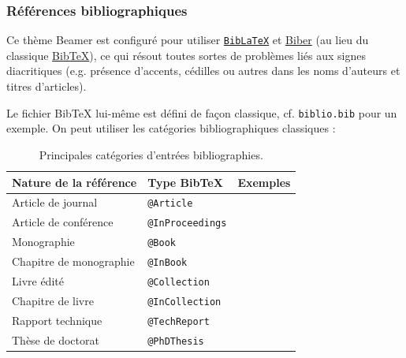\documentclass[10pt,    %
    french,             %
    xcolor=table,       %
    envcountsect,       %
    aspectratio=43      %
]{beamer}
\begin{document}
\begin{frame}
    \frametitle{Références bibliographiques}
    
    Ce thème Beamer est configuré pour utiliser \href{https://ctan.org/pkg/biblatex?lang=en}{\texttt{BibLaTeX}} et \href{http://biblatex-biber.sourceforge.net/}{Biber} (au lieu du classique \href{http://www.bibtex.org/}{BibTeX}), ce qui résout toutes sortes de problèmes liés aux signes diacritiques (e.g. présence d'accents, cédilles ou autres dans les noms d'auteurs et titres d'articles).
    
    \medskip
    Le fichier BibTeX lui-même est défini de façon classique, cf. \texttt{biblio.bib} pour un exemple. On peut utiliser les catégories bibliographiques classiques :
    
    \begin{table}[H]
        \small
        \centering
        \begin{tabular}{l l r}
            \hline
	        \rowcolor{fgLightRed} 
            \textbf{Nature de la référence} & \textbf{Type BibTeX} & \textbf{Exemples}\\
            \hline
            Article de journal & \texttt{@Article} & \cite{Fortunato2010, Cossu2016} \\
            Article de conférence & \texttt{@InProceedings} & \cite{Wei1989, Mauttone2008} \\
            Monographie & \texttt{@Book} & \cite{Wolsey1998, Masuda2016} \\
            Chapitre de monographie & \texttt{@InBook} & \cite{Mainzer2007a, Reichardt2009a} \\
            Livre édité & \texttt{@Collection} & \cite{Pastor-Satorras2003a, Brandes2005} \\
            Chapitre de livre & \texttt{@InCollection} & \cite{Danon2007, Labatut2012a} \\
            Rapport technique & \texttt{@TechReport} & \cite{Rosvall2009a, Paraskevopoulos2013} \\
            Thèse de doctorat & \texttt{@PhDThesis} & \cite{Wong1978, Gerbaud2010} \\
            \hline
        \end{tabular}
        \vspace{-0.25cm}
        \caption{Principales catégories d'entrées bibliographies.}
        \label{tab:bibtex}
    \end{table}
\end{frame}
\end{document}
